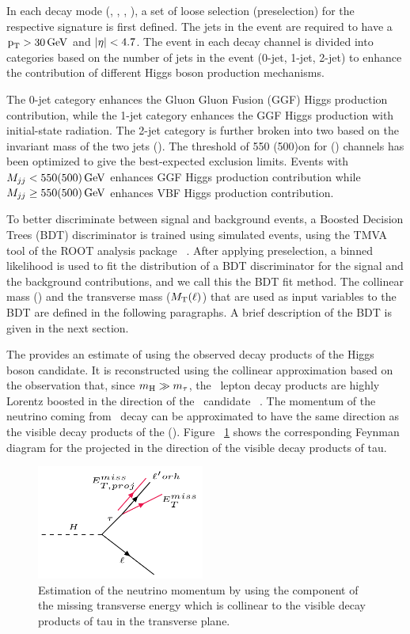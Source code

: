 In each decay mode (\Hemu, \Hehad, \Hmue, \Hmuhad), a set of loose selection (preselection) for the respective signature is first defined. The jets in the event are required to have a $\text{p}_\text{T} > 30\,\text{Ge\hspace{-.08em}V}$ and $\lvert\eta\rvert < 4.7$. The event in each decay channel is divided into categories based on the number of jets in the event (0-jet, 1-jet, 2-jet) to enhance the contribution of different Higgs boson production mechanisms.

The 0-jet category enhances the Gluon Gluon Fusion (GGF) Higgs production contribution, while the 1-jet category enhances the GGF Higgs production with initial-state radiation. The 2-jet category is further broken into two based on the invariant mass of the two jets (\mjj). The threshold of 550 (500)\GeV on \mjj for \mutau(\etau) channels has been optimized to give the best-expected exclusion limits. Events with $M_{jj} < 550(500)\,\text{Ge\hspace{-.08em}V}$ enhances GGF Higgs production contribution while $M_{jj} \ge 550(500)\,\text{Ge\hspace{-.08em}V}$ enhances VBF Higgs production contribution.

To better discriminate between signal and background events, a Boosted Decision Trees (BDT) discriminator is trained using simulated events, using the TMVA tool of the ROOT analysis package ~\cite{Hocker:2007ht}. After applying preselection, a binned likelihood is used to fit the distribution of a BDT discriminator for the signal and the background contributions, and we call this the BDT fit method. The collinear mass (\mcol) and the transverse mass ($M_\mathrm{T}(\ell)$) that are used as input variables to the BDT are defined in the following paragraphs. A brief description of the BDT is given in the next section.

The \mcol provides an estimate of \mh using the observed decay products of the Higgs boson candidate. It is reconstructed using the collinear approximation based on the observation that, since $m_{\text{H}} \gg m_{\tau}$, the \Pgt\, lepton decay products are highly Lorentz boosted in the direction of the \Pgt\, candidate ~\cite{Ellis:1987xu}. The momentum of the neutrino coming from \Pgt\, decay can be approximated to have the same direction as the visible decay products of the \Pgt(\vectvis). Figure ~\ref{fig:METproj} shows the corresponding Feynman diagram for the \met projected in the direction of the visible decay products of tau.

\begin{figure}[htbp]
  \centering
  \includegraphics[width=0.49\textwidth]{plots/chapter6/Feynman/METproj.png}
  \caption{Estimation of the neutrino momentum \metproj by using the component of the missing transverse energy \met which is collinear to the visible decay products of tau in the transverse plane.}
  \label{fig:METproj}
\end{figure}

